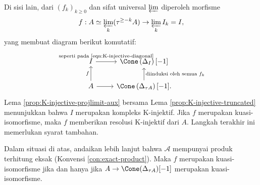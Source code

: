 Di sisi lain, dari $(f_k)_{k\geq0}$ dan sifat universal $\varprojlim$
diperoleh morfisme
\[
f:A\simeq\varprojlim_k(\tau^{\geq-k}A)\to\varprojlim_k I_k=I,
\]
yang membuat diagram berikut komutatif:
\begin{equation}\label{eqn:K-injective-A-I}\begin{tikzcd}
	I \arrow[r, "\text{seperti pada \eqref{eqn:K-injective-diagonal}}"
	inner sep=0.4em] & \Cone\left(\Delta_I\right)[-1] \\
	A \arrow[r] \arrow[u, "f"] &
	\Cone\left( \Delta_{\tau A} \right)[-1]
	\arrow[u, "\text{diinduksi oleh semua $f_k$}"'].
\end{tikzcd}\end{equation}
Lema \ref{prop:K-injective-projlimit-aux} bersama Lema
\ref{prop:K-injective-truncated} menunjukkan bahwa $I$ merupakan kompleks
K-injektif. Jika $f$ merupakan kuasi-isomorfisme, maka $f$ memberikan
resolusi K-injektif dari $A$. Langkah terakhir ini memerlukan syarat tambahan.

\begin{lema}\label{prop:K-injective-equiv}
	Dalam situasi di atas, andaikan lebih lanjut bahwa $\mathcal{A}$ mempunyai
	produk terhitung eksak (Konvensi \ref{con:exact-product}). Maka $f$
	merupakan kuasi-isomorfisme jika dan hanya jika
	$A\to\Cone(\Delta_{\tau A})[-1]$ merupakan kuasi-isomorfisme.
\end{lema}

